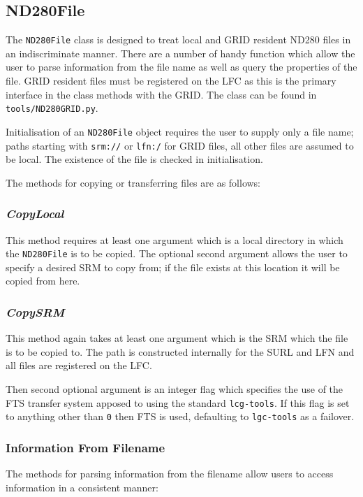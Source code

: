 \documentclass[11pt]{article}
\begin{document}
\subsection{ND280File}
The \verb+ND280File+ class is designed to treat local and GRID
resident ND280 files in an indiscriminate manner. There are a number
of handy function which allow the user to parse information from the
file name as well as query the properties of the file. GRID resident
files must be registered on the LFC as this is the primary interface
in the class methods with the GRID. The class can be found in
\verb+tools/ND280GRID.py+.

Initialisation of an \verb+ND280File+ object requires the user to supply only
a file name; paths starting with \verb+srm://+ or \verb+lfn:/+ for
GRID files, all other files are assumed to be local. The existence of
the file is checked in initialisation.

The methods for copying or transferring files are as follows:

\subsubsection*{\textit{CopyLocal}}
This method requires at least one argument which is a local directory
in which the \verb+ND280File+ is to be copied. The optional second argument
allows the user to specify a desired SRM to copy from; if the file
exists at this location it will be copied from here.

\subsubsection*{\textit{CopySRM}}
This method again takes at least one argument which is the SRM which
the file is to be copied to. The path is constructed internally for
the SURL and LFN and all files are registered on the LFC.

Then second optional argument is an integer flag which specifies the
use of the FTS transfer system apposed to using the standard
\verb+lcg-tools+. If this flag is set to anything other than \verb+0+
then FTS is used, defaulting to \verb+lgc-tools+ as a failover.

\subsubsection*{Information From Filename}
The methods for parsing information from the filename allow users to
access information in a consistent manner:
\end{document}
